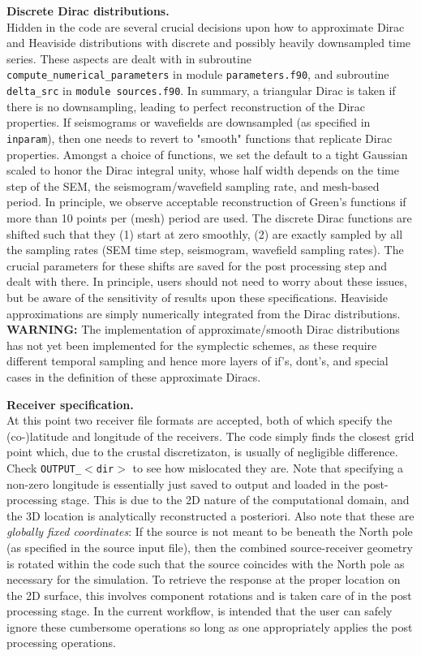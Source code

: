 \documentclass[11pt,letter,fleqn,english,notitlepage]{article}
\begin{document}
\noindent \textbf{Discrete Dirac distributions.}\\
Hidden in the code are several crucial decisions upon how to approximate Dirac
and Heaviside distributions with discrete and possibly heavily downsampled time
series. These aspects are dealt with in subroutine {\tt
compute\_numerical\_parameters} in module {\tt parameters.f90}, and subroutine
{\tt delta\_src} in {\tt module sources.f90}.  In summary, a triangular Dirac
is taken if there is no downsampling, leading to perfect reconstruction of the
Dirac properties. If seismograms or wavefields are downsampled (as specified in
{\tt inparam}), then one needs to revert to "smooth" functions that replicate
Dirac properties. Amongst a choice of functions, we set the default to a tight
Gaussian scaled to honor the Dirac integral unity, whose half width depends on
the time step of the SEM, the seismogram/wavefield sampling rate, and
mesh-based period. In principle, we observe acceptable reconstruction of
Green's functions if more than 10 points per (mesh) period are used. The
discrete Dirac functions are shifted such that they (1) start at zero smoothly,
(2) are exactly sampled by all the sampling rates (SEM time step, seismogram,
wavefield sampling rates). The crucial parameters for these shifts are saved
for the post processing step and dealt with there. In principle, users should
not need to worry about these issues, but be aware of the sensitivity of
results upon these specifications. Heaviside approximations are simply
numerically integrated from the Dirac distributions.\\

\textbf{WARNING:} The implementation of approximate/smooth Dirac distributions
has not yet been implemented for the symplectic schemes, as these require
different temporal sampling and hence more layers of if's, dont's, and special
cases in the definition of these approximate Diracs.

\noindent \textbf{Receiver specification.}\\
At this point two receiver file formats are accepted, both of which specify the
(co-)latitude and longitude of the receivers. The code simply finds the closest
grid point which, due to the crustal discretizaton, is usually of negligible
difference. Check {\tt OUTPUT\_$<$dir$>$} to see how mislocated they are.  Note
that specifying a non-zero longitude is essentially just saved to output and
loaded in the post-processing stage. This is due to the 2D nature of the
computational domain, and the 3D location is analytically reconstructed a
posteriori. Also note that these are \textit{globally fixed coordinates}: If
the source is not meant to be beneath the North pole (as specified in the
source input file), then the combined source-receiver geometry is rotated
within the code such that the source coincides with the North pole as necessary
for the simulation.  To retrieve the response at the proper location on the 2D
surface, this involves component rotations and is taken care of in the post
processing stage. In the current workflow, is intended that the user can safely
ignore these cumbersome operations so long as one appropriately applies the
post processing operations. \\
\end{document}
